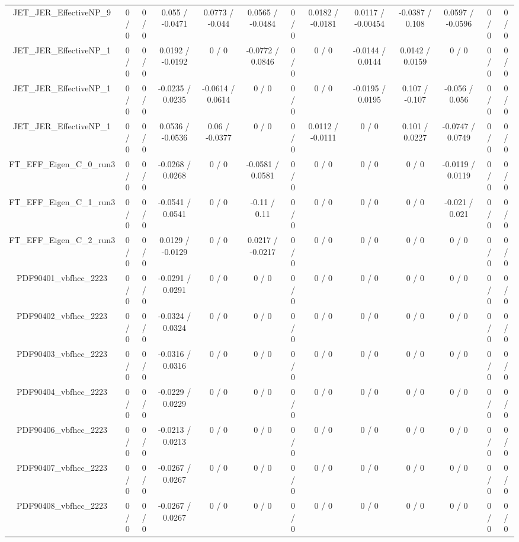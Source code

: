 \documentclass[10pt]{article}
\begin{document}
\begin{table}[htbp]
\begin{center}
\begin{tabular}{|c|c|c|c|c|c|c|c|c|c|c|c|c|}
  JET_JER_EffectiveNP_9 & 0 / 0 & 0 / 0 & 0.055 / -0.0471 & 0.0773 / -0.044 & 0.0565 / -0.0484 & 0 / 0 & 0.0182 / -0.0181 & 0.0117 / -0.00454 & -0.0387 / 0.108 & 0.0597 / -0.0596 & 0 / 0 & 0 / 0 \\ 
  JET_JER_EffectiveNP_1 & 0 / 0 & 0 / 0 & 0.0192 / -0.0192 & 0 / 0 & -0.0772 / 0.0846 & 0 / 0 & 0 / 0 & -0.0144 / 0.0144 & 0.0142 / 0.0159 & 0 / 0 & 0 / 0 & 0 / 0 \\ 
  JET_JER_EffectiveNP_1 & 0 / 0 & 0 / 0 & -0.0235 / 0.0235 & -0.0614 / 0.0614 & 0 / 0 & 0 / 0 & 0 / 0 & -0.0195 / 0.0195 & 0.107 / -0.107 & -0.056 / 0.056 & 0 / 0 & 0 / 0 \\ 
  JET_JER_EffectiveNP_1 & 0 / 0 & 0 / 0 & 0.0536 / -0.0536 & 0.06 / -0.0377 & 0 / 0 & 0 / 0 & 0.0112 / -0.0111 & 0 / 0 & 0.101 / 0.0227 & -0.0747 / 0.0749 & 0 / 0 & 0 / 0 \\ 
  FT_EFF_Eigen_C_0_run3 & 0 / 0 & 0 / 0 & -0.0268 / 0.0268 & 0 / 0 & -0.0581 / 0.0581 & 0 / 0 & 0 / 0 & 0 / 0 & 0 / 0 & -0.0119 / 0.0119 & 0 / 0 & 0 / 0 \\ 
  FT_EFF_Eigen_C_1_run3 & 0 / 0 & 0 / 0 & -0.0541 / 0.0541 & 0 / 0 & -0.11 / 0.11 & 0 / 0 & 0 / 0 & 0 / 0 & 0 / 0 & -0.021 / 0.021 & 0 / 0 & 0 / 0 \\ 
  FT_EFF_Eigen_C_2_run3 & 0 / 0 & 0 / 0 & 0.0129 / -0.0129 & 0 / 0 & 0.0217 / -0.0217 & 0 / 0 & 0 / 0 & 0 / 0 & 0 / 0 & 0 / 0 & 0 / 0 & 0 / 0 \\ 
  PDF90401_vbfhcc_2223 & 0 / 0 & 0 / 0 & -0.0291 / 0.0291 & 0 / 0 & 0 / 0 & 0 / 0 & 0 / 0 & 0 / 0 & 0 / 0 & 0 / 0 & 0 / 0 & 0 / 0 \\ 
  PDF90402_vbfhcc_2223 & 0 / 0 & 0 / 0 & -0.0324 / 0.0324 & 0 / 0 & 0 / 0 & 0 / 0 & 0 / 0 & 0 / 0 & 0 / 0 & 0 / 0 & 0 / 0 & 0 / 0 \\ 
  PDF90403_vbfhcc_2223 & 0 / 0 & 0 / 0 & -0.0316 / 0.0316 & 0 / 0 & 0 / 0 & 0 / 0 & 0 / 0 & 0 / 0 & 0 / 0 & 0 / 0 & 0 / 0 & 0 / 0 \\ 
  PDF90404_vbfhcc_2223 & 0 / 0 & 0 / 0 & -0.0229 / 0.0229 & 0 / 0 & 0 / 0 & 0 / 0 & 0 / 0 & 0 / 0 & 0 / 0 & 0 / 0 & 0 / 0 & 0 / 0 \\ 
  PDF90406_vbfhcc_2223 & 0 / 0 & 0 / 0 & -0.0213 / 0.0213 & 0 / 0 & 0 / 0 & 0 / 0 & 0 / 0 & 0 / 0 & 0 / 0 & 0 / 0 & 0 / 0 & 0 / 0 \\ 
  PDF90407_vbfhcc_2223 & 0 / 0 & 0 / 0 & -0.0267 / 0.0267 & 0 / 0 & 0 / 0 & 0 / 0 & 0 / 0 & 0 / 0 & 0 / 0 & 0 / 0 & 0 / 0 & 0 / 0 \\ 
  PDF90408_vbfhcc_2223 & 0 / 0 & 0 / 0 & -0.0267 / 0.0267 & 0 / 0 & 0 / 0 & 0 / 0 & 0 / 0 & 0 / 0 & 0 / 0 & 0 / 0 & 0 / 0 & 0 / 0 \\ 

\end{tabular}
\end{center}
\end{table}
\end{document}
